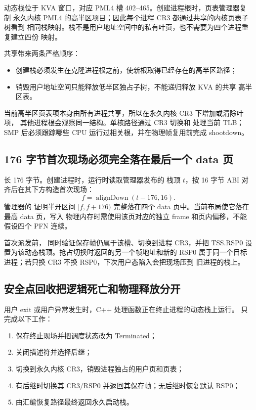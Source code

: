 动态栈位于 KVA 窗口，对应 PML4 槽 402--465。创建进程根时，页表管理器复制
永久内核 PML4 的高半区项目；因此每个进程 CR3 都通过共享的内核页表子树看到
相同栈映射。栈不是用户地址空间中的私有叶页，也不需要为四个进程重复建立四份
映射。

共享带来两条严格顺序：

\begin{itemize}
  \item 创建栈必须发生在克隆进程根之前，使新根取得已经存在的高半区路径；
  \item 销毁用户地址空间只能释放低半区独占子树，不能递归释放 KVA 的共享
        高半区表。
\end{itemize}

当前高半区页表项本身由所有进程共享，所以在永久内核 CR3 下增加或清除叶项，
其他进程根会观察同一结构。单核路径通过 CR3 切换和  处理当前
TLB；SMP 后必须跟踪哪些 CPU 运行过相关根，并在物理帧复用前完成 shootdown。

\subsection{176 字节首次现场必须完全落在最后一个 data 页}

 长 176 字节。创建进程时，运行时读取管理器发布的
栈顶 \(t\)，按 16 字节 ABI 对齐后在其下方构造首次现场：
\[
  f=\operatorname{alignDown}(t-176,16).
\]
管理器的  证明半开区间
\([f,f+176)\) 完整落在四个 data 页中。当前布局使它落在最高 data 页，写入
物理内存时需使用该页对应的独立 frame 和页内偏移，不能假设四个 PFN 连续。

首次派发前， 同时验证保存帧仍属于该槽、切换到进程
CR3，并把 TSS.RSP0 设置为该动态栈顶。抢占切换时返回的另一个帧地址和新的
RSP0 属于同一个目标进程；若只换 CR3 不换 RSP0，下次用户态陷入会把现场压到
旧进程的栈上。

\subsection{安全点回收把逻辑死亡和物理释放分开}

用户 exit 或用户异常发生时，C++ 处理函数正在终止进程的动态栈上运行。
 只完成以下工作：

\begin{enumerate}[label=\arabic*.]
  \item 保存终止现场并把调度状态改为 Terminated；
  \item 关闭描述符并选择后继；
  \item 切换到永久内核 CR3，销毁进程独占的用户页和页表；
  \item 有后继时切换其 CR3/RSP0 并返回其保存帧；无后继时恢复默认 RSP0；
  \item 由汇编恢复路径最终返回永久启动栈。
\end{enumerate}

